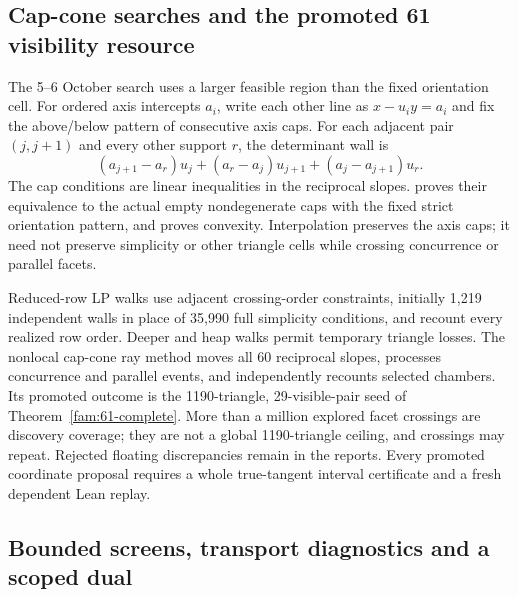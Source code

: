 \subsection{Cap-cone searches and the promoted 61 visibility resource}
\label{exp:cap-cone}

The 5--6 October search uses a larger feasible region than the fixed
orientation cell. For ordered axis intercepts $a_i$, write each other
line as $x-u_i y=a_i$ and fix the above/below pattern of consecutive
axis caps. For each adjacent pair $(j,j+1)$ and every other support $r$,
the determinant wall is
\[
 (a_{j+1}-a_r)u_j+(a_r-a_j)u_{j+1}+(a_j-a_{j+1})u_r.
\]
The cap conditions are linear inequalities in the reciprocal slopes.
proves their equivalence to the actual empty nondegenerate caps with the
fixed strict orientation pattern, and
proves convexity. Interpolation preserves the axis caps; it need not
preserve simplicity or other triangle cells while crossing concurrence
or parallel facets.

Reduced-row LP walks use adjacent crossing-order constraints, initially
1,219 independent walls in place of 35,990 full simplicity conditions,
and recount every realized row order. Deeper and heap walks permit
temporary triangle losses. The nonlocal cap-cone ray method moves all
60 reciprocal slopes, processes concurrence and parallel events, and
independently recounts selected chambers. Its promoted outcome is the
1190-triangle, 29-visible-pair seed of Theorem~\ref{fam:61-complete}.
More than a million explored facet crossings are discovery coverage;
they are not a global 1190-triangle ceiling, and crossings may repeat.
Rejected floating discrepancies remain in the reports. Every promoted
coordinate proposal requires a whole true-tangent interval certificate
and a fresh dependent Lean replay.

\subsection{Bounded screens, transport diagnostics and a scoped dual}
\label{exp:october-five-searches}

